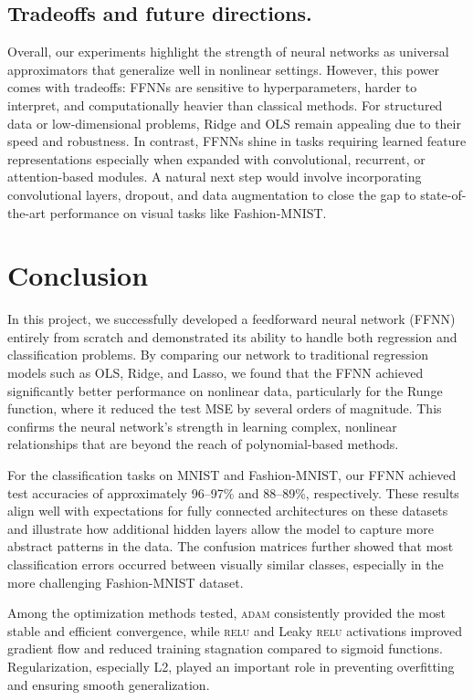 \documentclass[amssymb,twocolumn,aps]{revtex4}
\begin{document}
\subsection{Tradeoffs and future directions.}  
Overall, our experiments highlight the strength of neural networks as universal approximators that generalize well in nonlinear settings. However, this power comes with tradeoffs: FFNNs are sensitive to hyperparameters, harder to interpret, and computationally heavier than classical methods. For structured data or low-dimensional problems, Ridge and OLS remain appealing due to their speed and robustness. In contrast, FFNNs shine in tasks requiring learned feature representations especially when expanded with convolutional, recurrent, or attention-based modules. A natural next step would involve incorporating convolutional layers, dropout, and data augmentation to close the gap to state-of-the-art performance on visual tasks like Fashion-MNIST.



\section{Conclusion}\label{section:conclusion}
In this project, we successfully developed a feedforward neural network (FFNN) entirely from scratch and demonstrated its ability to handle both regression and classification problems. By comparing our network to traditional regression models such as OLS, Ridge, and Lasso, we found that the FFNN achieved significantly better performance on nonlinear data, particularly for the Runge function, where it reduced the test MSE by several orders of magnitude. This confirms the neural network’s strength in learning complex, nonlinear relationships that are beyond the reach of polynomial-based methods.

For the classification tasks on MNIST and Fashion-MNIST, our FFNN achieved test accuracies of approximately 96--97\% and 88--89\%, respectively. These results align well with expectations for fully connected architectures on these datasets and illustrate how additional hidden layers allow the model to capture more abstract patterns in the data. The confusion matrices further showed that most classification errors occurred between visually similar classes, especially in the more challenging Fashion-MNIST dataset.

Among the optimization methods tested, \textsc{adam} consistently provided the most stable and efficient convergence, while \textsc{relu} and Leaky \textsc{relu} activations improved gradient flow and reduced training stagnation compared to sigmoid functions. Regularization, especially L2, played an important role in preventing overfitting and ensuring smooth generalization.
\end{document}
